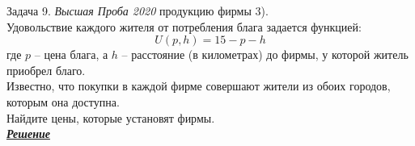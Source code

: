 \begin{mybox}{Задача 9. \textit{Высшая Проба 2020}}
    продукцию фирмы 3).\\
    \indent\setlength{\parindent}{1em}Удовольствие каждого жителя от потребления блага задается функцией:
    $$U(p,h)=15-p-h$$
    \indent\setlength{\parindent}{1em}где $p$ – цена блага, а $h$ – расстояние (в километрах) до фирмы, у которой житель
    приобрел благо.\\
    \indent\setlength{\parindent}{1em}Известно, что покупки в каждой фирме совершают жители из обоих городов, которым
    она доступна.\\
    \indent\setlength{\parindent}{1em}Найдите цены, которые установят фирмы.\bigskip\\
    \textit{\textbf{\centering\href{https://iloveeconomics.ru/sites/default/files/olimp/proba/2020/proba_2020_2020_ekonomika_2_etap_10_klass_19909.docx}{Решение}}}
\end{mybox}

